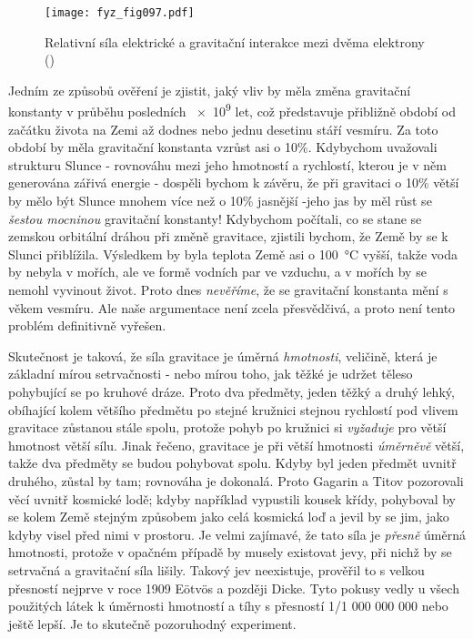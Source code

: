 {    \begin{figure}[ht!]  %
      \centering
      \texttt{[image: fyz\_fig097.pdf]}
      \caption{Relativní síla elektrické a gravitační interakce mezi dvěma elektrony
               (\cite[s.~104]{Feynman01})}
      \label{fyz:fig097}
    \end{figure}
    Jedním ze způsobů ověření je zjistit, jaký vliv by měla změna gravitační konstanty v průběhu 
    posledních \num{e9} let, což představuje přibližně období od začátku života na Zemi až dodnes 
    nebo jednu desetinu stáří vesmíru. Za toto období by měla gravitační konstanta vzrůst asi o 
    10\%. Kdybychom uvažovali strukturu Slunce - rovnováhu mezi jeho hmotností a rychlostí, kterou 
    je v něm generována zářivá energie - dospěli bychom k závěru, že při gravitaci o 10\% větší by 
    mělo být Slunce mnohem více než o 10\% jasnější -jeho jas by měl růst se \emph{šestou mocninou} 
    gravitační konstanty! Kdybychom počítali, co se stane se zemskou orbitální dráhou při změně 
    gravitace, zjistili bychom, že Země by se k Slunci přiblížila. Výsledkem by byla teplota Země 
    asi o \SI{100} {\degreeCelsius} vyšší, takže voda by nebyla v mořích, ale ve formě vodních par 
    ve vzduchu, a v mořích by se nemohl vyvinout život. Proto dnes \emph{nevěříme}, že se 
    gravitační konstanta mění s věkem vesmíru. Ale naše argumentace není zcela přesvědčivá, a proto 
    není tento problém definitivně vyřešen.
    
    Skutečnost je taková, že síla gravitace je úměrná \emph{hmotnosti}, veličině, která je základní 
    mírou setrvačnosti - nebo mírou toho, jak těžké je udržet těleso pohybující se po kruhové 
    dráze. Proto dva předměty, jeden těžký a druhý lehký, obíhající kolem většího předmětu po 
    stejné kružnici stejnou rychlostí pod vlivem gravitace zůstanou stále spolu, protože pohyb po 
    kružnici si \emph{vyžaduje} pro větší hmotnost větší sílu. Jinak řečeno, gravitace je při větší 
    hmotnosti \emph{úměrněvě} větší, takže dva předměty se budou pohybovat spolu. Kdyby byl jeden 
    předmět uvnitř druhého, zůstal by tam; rovnováha je dokonalá. Proto Gagarin a Titov pozorovali 
     věcí uvnitř kosmické lodě; kdyby například vypustili kousek křídy, pohyboval by 
    se kolem Země stejným způsobem jako celá kosmická loď a jevil by se jim, jako kdyby visel před 
    nimi v prostoru. Je velmi zajímavé, že tato síla je	\emph{přesně} úměrná hmotnosti, protože v 
    opačném případě by musely existovat jevy, při nichž by se setrvačná a gravitační síla lišily. 
    Takový jev neexistuje, prověřil to s velkou přesností nejprve v roce \num{1909} E\"{o}tv\"{o}s 
    a později Dicke. Tyto pokusy vedly u všech použitých látek k úměrnosti hmotností a tíhy s 
    přesností \num{1/1 000 000 000} nebo ještě lepší. Je to skutečně pozoruhodný experiment.
    
}
